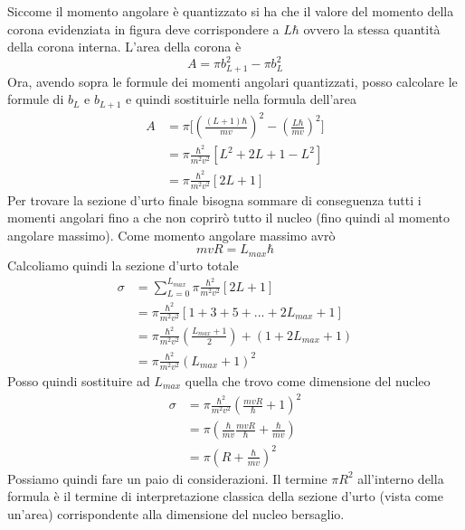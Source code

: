 Siccome il momento angolare è quantizzato si ha che il valore del momento della corona evidenziata in figura deve corrispondere a $L\hbar$ ovvero la stessa quantità della corona interna.
L'area della corona è
\begin{equation}
A=\pi b_{L+1}^2-\pi b_L^2
\end{equation}
Ora, avendo sopra le formule dei momenti angolari quantizzati, posso calcolare le formule di $b_L$ e $b_{L+1}$ e quindi sostituirle nella formula dell'area
\begin{equation}
\begin{split}
A&=\pi \biggl[\left(\frac{(L+1)\hbar}{mv}\right)^2-\left(\frac{L\hbar}{mv}\right)^2\biggl]\\
&=\pi\frac{\hbar^2}{m^2v^2}[L^2+2L+1-L^2]\\
&=\pi \frac{\hbar^2}{m^2v^2}[2L+1]
\end{split}
\end{equation}
Per trovare la sezione d'urto finale bisogna sommare di conseguenza tutti i momenti angolari fino a che non coprirò tutto il nucleo (fino quindi al momento angolare massimo).
Come momento angolare massimo avrò
\begin{equation}
mvR=L_{max}\hbar
\end{equation}
Calcoliamo quindi la sezione d'urto totale
\begin{equation}
\begin{split}
\sigma&=\sum_{L=0}^{L_{max}}\pi \frac{\hbar^2}{m^2v^2}[2L+1]\\
&=\pi \frac{\hbar^2}{m^2v^2}[1+3+5+ ... +2L_{max}+1]\\
&=\pi \frac{\hbar^2}{m^2v^2}\left(\frac{L_{max}+1}{2}\right)+(1+2L_{max}+1)\\
&=\pi \frac{\hbar^2}{m^2v^2}(L_{max}+1)^2
\end{split}
\end{equation}
Posso quindi sostituire ad $L_{max}$ quella che trovo come dimensione del nucleo
\begin{equation}
\begin{split}
\sigma&=\pi \frac{\hbar^2}{m^2v^2}\left(\frac{mvR}{\hbar}+1\right)^2\\
&=\pi\left(\frac{\hbar}{mv}\frac{mvR}{\hbar}+\frac{\hbar}{mv}\right)\\
&=\pi\left(R+\frac{\hbar}{mv}\right)^2
\end{split}
\end{equation}
Possiamo quindi fare un paio di considerazioni. 
Il termine $\pi R^2$ all'interno della formula è il termine di interpretazione classica della sezione d'urto (vista come un'area) corrispondente alla dimensione del nucleo bersaglio.
